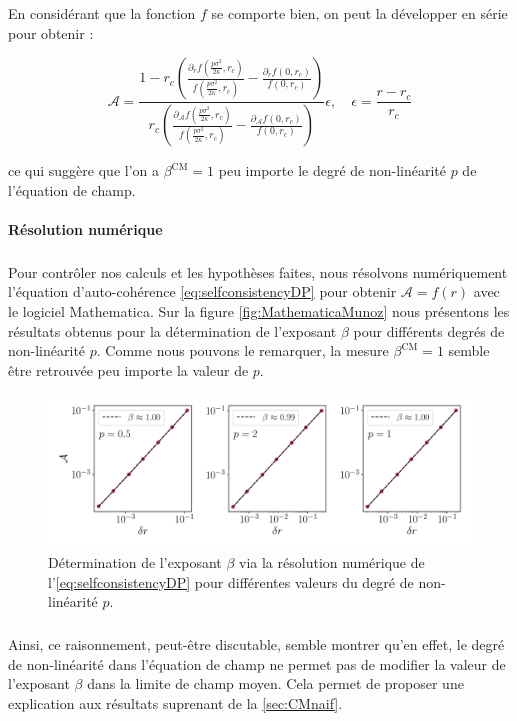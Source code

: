 \noindent En considérant que la fonction $f$ se comporte bien, on peut la développer en série pour obtenir : 

\begin{equation}
    \mathcal{A} = \frac{1-r_c\left( \frac{\partial_r f(\frac{p\sigma^2}{2\kappa},r_c)}{f(\frac{p\sigma^2}{2\kappa},r_c)}- \frac{\partial_rf(0,r_c)}{f(0,r_c)} \right)}{r_c\left( \frac{\partial_\mathcal{A} f(\frac{p\sigma^2}{2\kappa},r_c)}{f(\frac{p\sigma^2}{2\kappa},r_c)}- \frac{\partial_\mathcal{A} f(0,r_c)}{f(0,r_c)} \right)}\epsilon,\quad \epsilon = \frac{r-r_c}{r_c}
\end{equation}

\noindent ce qui suggère que l'on a $\beta^\text{CM} = 1$ peu importe le degré de non-linéarité $p$ de l'équation de champ.

\paragraph{Résolution numérique}

\subparagraph{}Pour contrôler nos calculs et les hypothèses faites, nous résolvons numériquement l'équation d'auto-cohérence \autoref{eq:selfconsistencyDP} pour obtenir $\mathcal{A} = f(r)$ avec le logiciel Mathematica. Sur la figure \autoref{fig:MathematicaMunoz} nous présentons les résultats obtenus pour la détermination de l'exposant $\beta$ pour différents degrés de non-linéarité $p$. Comme nous pouvons le remarquer, la mesure $\beta^\text{CM}=1$ semble être retrouvée peu importe la valeur de $p$.

\begin{figure}[h]
	\centering
	\includegraphics[width=\textwidth]{Chapitre6/Figures/MathematicaMunozDP.pdf}
	\caption{Détermination de l'exposant $\beta$ via la résolution numérique de l'\autoref{eq:selfconsistencyDP} pour différentes valeurs du degré de non-linéarité $p$.}
	\label{fig:MathematicaMunoz}
\end{figure}

\subparagraph{}Ainsi, ce raisonnement, peut-être discutable, semble montrer qu'en effet, le degré de non-linéarité dans l'équation de champ ne permet pas de modifier la valeur de l'exposant $\beta$ dans la limite de champ moyen. Cela permet de proposer une explication aux résultats suprenant de la \autoref{sec:CMnaif}.

